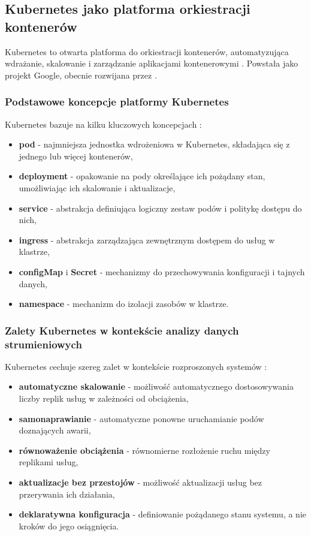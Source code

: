 \subsection{Kubernetes jako platforma orkiestracji kontenerów}
\label{subsec:kubernetes}

Kubernetes to otwarta platforma do orkiestracji kontenerów, automatyzująca wdrażanie, skalowanie i zarządzanie aplikacjami
kontenerowymi \cite{kubernetes}. Powstała jako projekt Google, obecnie rozwijana przez \cite{cncf_website}.

\subsubsection{Podstawowe koncepcje platformy Kubernetes}
\label{subsubsec:podstawy_kubernetes}

Kubernetes bazuje na kilku kluczowych koncepcjach \cite{kubernetes_concepts}:

\begin{itemize}
    \item \textbf{pod} - najmniejsza jednostka wdrożeniowa w Kubernetes, składająca się z jednego lub więcej kontenerów,
    \item \textbf{deployment} - opakowanie na pody określające ich pożądany stan, umożliwiając ich skalowanie i aktualizacje,
    \item \textbf{service} - abstrakcja definiująca logiczny zestaw podów i politykę dostępu do nich,
    \item \textbf{ingress} - abstrakcja zarządzająca zewnętrznym dostępem do usług w klastrze,
    \item \textbf{configMap} i \textbf{Secret} - mechanizmy do przechowywania konfiguracji i tajnych danych,
    \item \textbf{namespace} - mechanizm do izolacji zasobów w klastrze.
\end{itemize}

\subsubsection{Zalety Kubernetes w kontekście analizy danych strumieniowych}
\label{subsubsec:zalety_kubernetes}

Kubernetes cechuje szereg zalet w kontekście rozproszonych systemów \cite{kubernetes_benefits}:

\begin{itemize}
    \item \textbf{automatyczne skalowanie} - możliwość automatycznego dostosowywania liczby replik usług w zależności od obciążenia,
    \item \textbf{samonaprawianie} - automatyczne ponowne uruchamianie podów doznających awarii,
    \item \textbf{równoważenie obciążenia} - równomierne rozłożenie ruchu między replikami usług,
    \item \textbf{aktualizacje bez przestojów} - możliwość aktualizacji usług bez przerywania ich działania,
    \item \textbf{deklaratywna konfiguracja} - definiowanie pożądanego stanu systemu, a nie kroków do jego osiągnięcia.
\end{itemize}

